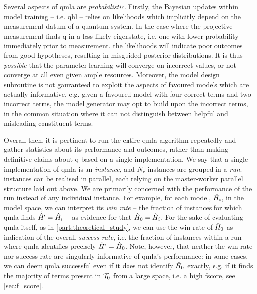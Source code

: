 Several aspects of \gls{qmla} are \emph{probabilistic}.
Firstly, the Bayesian updates within model training -- i.e. \gls{qhl} --
    relies on \glspl{likelihood} which 
    implicitly depend on the measurement datum of a quantum system.
In the case where the projective measurement finds \gls{q} in a less-likely eigenstate, 
    i.e. one with lower probability immediately prior to measurement, 
    the \glspl{likelihood}  will indicate poor outcomes from good hypotheses, 
    resulting in misguided posterior distributions. 
It is thus \emph{possible} that the parameter learning will converge on incorrect values,
    or not converge at all even given ample resources. 
Moreover, the model design subroutine is not gauranteed to exploit the aspects of favoured models which are 
    actually informative, e.g. given a favoured model with four correct terms and two incorrect terms, 
    the model generator may opt to build upon the incorrect terms, in the common situation where it can not distinguish between 
    helpful and misleading constituent terms.
\par 

Overall then, 
    it is pertinent to run the entire \gls{qmla} algorithm repeatedly and gather statistics about its performance and outcomes, 
    rather than making definitive claims about \gls{q} based on a single implementation.
We say that a single implementation of \gls{qmla} is an \emph{\gls{instance}},
    and $N_r$ \glspl{instance} are grouped in a \emph{\gls{run}}.
\Glspl{instance} can be realised in parallel, 
    each relying on the master-worker parallel structure laid out above. 
We are primarily concerned with the performance of the \gls{run} 
    instead of any individual instance. 
For example,
    for each model, $\hat{H}_i$, in the \gls{model space}, we can interpret its \emph{ \gls{win rate} } 
    -- the fraction of instances for which \gls{qmla} finds $\hat{H}^{\prime}=\hat{H}_i$ -- 
    as evidence for that $\hat{H}_0=\hat{H}_i$.
For the sake of evaluating \gls{qmla} itself, as in \cref{part:theoretical_study}, 
    we can use the  \gls{win rate}  of $\hat{H}_0$ as indication of the overall \emph{\gls{success rate}}, 
    i.e. the fraction of \glspl{instance} within a run where \gls{qmla} identifies precisely $\hat{H}^{\prime} = \hat{H}_0$. 
Note, however, that neither the  \gls{win rate}  nor \gls{success rate} are singularly informative 
    of \gls{qmla}'s performance: in some cases, we can deem \gls{qmla} successful even if it does not 
    identify $\hat{H}_0$ exactly, e.g. if it finds the majority of terms present in $\mathcal{T}_0$ from a large space, 
    i.e. a high \gls{fscore}, see \cref{sec:f_score}. 
\par 

